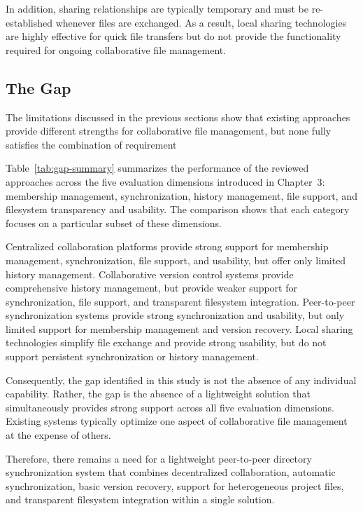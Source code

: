 In addition, sharing relationships are typically temporary and
must be re-established whenever files are exchanged. As a
result, local sharing technologies are highly effective for
quick file transfers but do not provide the functionality
required for ongoing collaborative file management.

\subsection{The Gap}

The limitations discussed in the previous sections
show that existing approaches provide different strengths for
collaborative file management, but none fully satisfies the
combination of requirement

Table~\ref{tab:gap-summary} summarizes the performance of the
reviewed approaches across the five evaluation dimensions
introduced in Chapter~3: membership management,
synchronization, history management, file support, and
filesystem transparency and usability. The comparison shows
that each category focuses on a particular subset of these
dimensions.

Centralized collaboration platforms provide strong support for
membership management, synchronization, file support, and
usability, but offer only limited history management.
Collaborative version control systems provide comprehensive
history management, but provide weaker support for
synchronization, file support, and transparent filesystem
integration. Peer-to-peer synchronization systems provide
strong synchronization and usability, but only limited support
for membership management and version recovery. Local sharing
technologies simplify file exchange and provide strong
usability, but do not support persistent synchronization or
history management.

Consequently, the gap identified in this study is not the
absence of any individual capability. Rather, the gap is the
absence of a lightweight solution that simultaneously provides
strong support across all five evaluation dimensions.
Existing systems typically optimize one aspect of
collaborative file management at the expense of others.

Therefore, there remains a need for a lightweight peer-to-peer
directory synchronization system that combines decentralized
collaboration, automatic synchronization, basic version
recovery, support for heterogeneous project files, and
transparent filesystem integration within a single solution.

